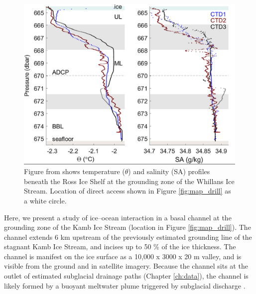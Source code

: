 \begin{figure}[!ht]
\centering
    \includegraphics[width=1\textwidth]{chapters/4/oceanobs1.png}
    \caption[Whillans observations]{Figure from \cite{begeman2018ocean} shows temperature ($\theta$) and salinity (SA) profiles beneath the Ross Ice Shelf at the grounding zone of the Whillans Ice Stream. Location of direct access shown in Figure \ref{fig:map_drill} as a white circle.}
    \label{fig:oceanobs1}
\end{figure}

Here, we present a study of ice--ocean interaction in a basal channel at the grounding zone of the Kamb Ice Stream (location in Figure \ref{fig:map_drill}). 
The channel extends 6 km upstream of the previously estimated grounding line of the stagnant Kamb Ice Stream, and incises up to 50 \% of the ice thickness. The channel is manifest on the ice surface as a  10,000 x 3000 x 20 m valley, and is visible from the ground and in satellite imagery. Because the channel sits at the outlet of estimated subglacial drainage paths (Chapter \ref{ch:data}), the channel is likely formed by a buoyant meltwater plume triggered by subglacial discharge \citep{le2009subglacial,kim2016active, alley2016impacts}.

